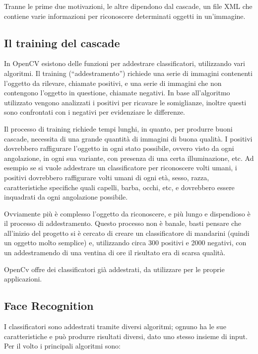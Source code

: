 Tranne le prime due motivazioni, le altre dipendono dal cascade, un file XML che contiene varie informazioni per riconoscere determinati oggetti in un'immagine. 

\subsection{Il training del cascade}
In OpenCV esistono delle funzioni per addestrare classificatori, utilizzando vari algoritmi. Il training (“addestramento”) richiede una serie di immagini contenenti l'oggetto da rilevare, chiamate positivi, e una serie di immagini che non contengono l'oggetto in questione, chiamate negativi. In base all'algoritmo utilizzato vengono analizzati i positivi per ricavare le somiglianze, inoltre questi sono confrontati con i negativi per evidenziare le differenze.

Il processo di training richiede tempi lunghi, in quanto, per produrre buoni cascade, necessita di una grande quantità di immagini di buona qualità. I positivi dovrebbero raffigurare l'oggetto in ogni stato possibile, ovvero visto da ogni angolazione, in ogni sua variante, con presenza di una certa illuminazione, etc. Ad esempio se si vuole addestrare un classificatore per riconoscere volti umani, i positivi dovrebbero raffigurare volti umani di ogni età, sesso, razza, caratteristiche specifiche quali capelli, barba, occhi, etc, e dovrebbero essere inquadrati da ogni angolazione possibile.

Ovviamente più è complesso l'oggetto da riconoscere, e più lungo e dispendioso è il processo di addestramento. Questo processo non è banale, basti pensare che all'inizio del progetto si è cercato di creare un classificatore di mandarini (quindi un oggetto molto semplice) e, utilizzando circa 300 positivi e 2000 negativi, con un addestramendo di una ventina di ore il risultato era di scarsa qualità.

OpenCv offre dei classificatori già addestrati, da utilizzare per le proprie applicazioni.

\subsection{Face Recognition}
I classificatori sono addestrati tramite diversi algoritmi; ognuno ha le sue caratteristiche e può produrre risultati diversi, dato uno stesso insieme di input. Per il volto i principali algoritmi sono:


